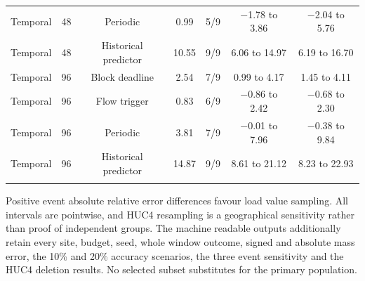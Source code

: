 \documentclass[lineno,pdflatex,sn-apa]{sn-jnl}%
\theoremstyle{thmstyleone}%
\theoremstyle{thmstyletwo}%
\theoremstyle{thmstylethree}%
\begin{document}
\begin{center}
\begin{tabular}{@{}lcccccc@{}}
Temporal & 48 & Periodic & 0.99 & 5/9 & $-$1.78 to 3.86 & $-$2.04 to 5.76\\
Temporal & 48 & Historical predictor & 10.55 & 9/9 & 6.06 to 14.97 & 6.19 to 16.70\\
Temporal & 96 & Block deadline & 2.54 & 7/9 & 0.99 to 4.17 & 1.45 to 4.11\\
Temporal & 96 & Flow trigger & 0.83 & 6/9 & $-$0.86 to 2.42 & $-$0.68 to 2.30\\
Temporal & 96 & Periodic & 3.81 & 7/9 & $-$0.01 to 7.96 & $-$0.38 to 9.84\\
Temporal & 96 & Historical predictor & 14.87 & 9/9 & 8.61 to 21.12 & 8.23 to 22.93\\
\botrule
\end{tabular}
\end{center}

Positive event absolute relative error differences favour load value sampling. All intervals are pointwise, and HUC4 resampling is a geographical sensitivity rather than proof of independent groups. The machine readable outputs additionally retain every site, budget, seed, whole window outcome, signed and absolute mass error, the 10\% and 20\% accuracy scenarios, the three event sensitivity and the HUC4 deletion results. No selected subset substitutes for the primary population.


\end{document}
